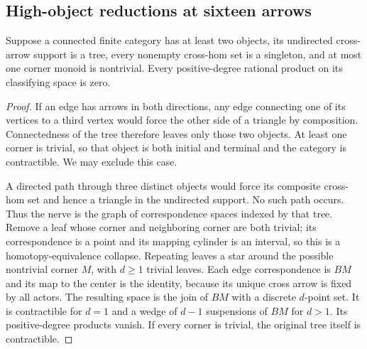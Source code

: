 \subsection{High-object reductions at sixteen arrows}

\begin{lemma}
\label{C:tree-singleton-core-cups}
Suppose a connected finite category has at least two objects,
its undirected cross-arrow support is a tree, every nonempty
cross-hom set is a singleton, and at most one corner monoid
is nontrivial.  Every positive-degree rational product on its
classifying space is zero.
\end{lemma}
\begin{proof}
If an edge has arrows in both directions, any edge connecting
one of its vertices to a third vertex would force the other
side of a triangle by composition.  Connectedness of the tree
therefore leaves only those two objects.  At least one corner
is trivial, so that object is both initial and terminal and
the category is contractible.  We may exclude this case.

A directed path through three distinct objects would force
its composite cross-hom set and hence a triangle in the
undirected support.  No such path occurs.  Thus the nerve
is the graph of correspondence spaces indexed by that tree.
Remove a leaf whose corner and neighboring corner are both
trivial; its correspondence is a point and its mapping
cylinder is an interval, so this is a homotopy-equivalence
collapse.  Repeating leaves a star around the possible
nontrivial corner $M$, with $d\geq1$ trivial leaves.
Each edge correspondence is $BM$ and its map to the center
is the identity, because its unique cross arrow is fixed
by all actors.  The resulting space is the join of $BM$
with a discrete $d$-point set.  It is contractible for $d=1$
and a wedge of $d-1$ suspensions of $BM$ for $d>1$.
Its positive-degree products vanish.  If every corner is
trivial, the original tree itself is contractible.
\end{proof}

